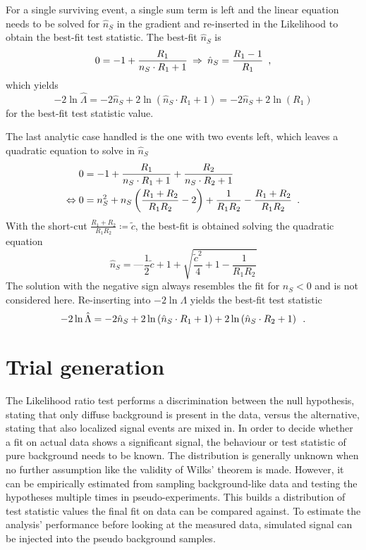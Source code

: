 For a single surviving event, a single sum term is left and the linear equation needs to be solved for $\hat{n}_S$ in the gradient and re-inserted in the Likelihood to obtain the best-fit test statistic.
The best-fit $\hat{n}_S$ is
\begin{equation}
  0 = -1 + \frac{R_1}{n_S\cdot R_1 + 1}
  \enspace\text{$\Rightarrow$}\enspace
  \hat{n}_S = \frac{R_1 - 1}{R_1}
  \enspace\text{,}
\end{equation}
which yields
\begin{equation}
  -2\ln\hat{\Lambda}
    = -2\hat{n}_S + 2\ln\left( \hat{n}_S \cdot R_1 + 1 \right)
    = -2\hat{n}_S + 2\ln(R_1)
\end{equation}
for the best-fit test statistic value.

The last analytic case handled is the one with two events left, which leaves a quadratic equation to solve in $\hat{n}_S$
\begin{align}
  0 &= -1 + \frac{R_1}{n_S\cdot R_1 + 1} + \frac{R_2}{n_S\cdot R_2 + 1} \\
  \Leftrightarrow
  0 &= n_S^2 + n_S \left(\frac{R_1 + R_2}{R_1 R_2} - 2\right) +
       \frac{1}{R_1 R_2} - \frac{R_1 + R_2}{R_1 R_2}
  \enspace\text{.}
\end{align}
With the short-cut $\frac{R_1 + R_2}{R_1 R_2} \coloneqq\tilde{c}$, the best-fit is obtained solving the quadratic equation
\begin{equation}
  \hat{n}_S = —\frac{1}{2}\tilde{c} + 1 + \sqrt{\frac{\tilde{c}^2}{4} + 1 - \frac{1}{R_1 R_2}}
\end{equation}
The solution with the negative sign always resembles the fit for $n_S < 0$ and is not considered here.
Re-inserting into $-2\ln\Lambda$ yields the best-fit test statistic
\begin{equation}
  -2\ln\hat{\Lambda}
  = -2\hat{n}_S +
      2\ln\left( \hat{n}_S \cdot R_1 + 1 \right) +
      2\ln\left( \hat{n}_S \cdot R_2 + 1 \right)
  \enspace\text{.}
\end{equation}


\section{Trial generation}
The Likelihood ratio test performs a discrimination between the null hypothesis, stating that only diffuse background is present in the data, versus the alternative, stating that also localized signal events are mixed in.
In order to decide whether a fit on actual data shows a significant signal, the behaviour or test statistic of pure background needs to be known.
The distribution is generally unknown when no further assumption like the validity of Wilks' theorem is made.
However, it can be empirically estimated from sampling background-like data and testing the hypotheses multiple times in pseudo-experiments.
This builds a distribution of test statistic values the final fit on data can be compared against.
To estimate the analysis' performance before looking at the measured data, simulated signal can be injected into the pseudo background samples.

